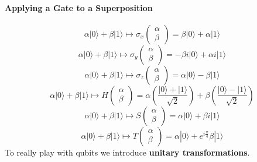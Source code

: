 \documentclass[10pt]{report}
\begin{document}
\paragraph{Applying a Gate to a Superposition}
$$\alpha|0\rangle + \beta|1\rangle \mapsto \sigma_x\left(\begin{array}{c}
\alpha\\\beta
\end{array}\right) = \beta|0\rangle + \alpha|1\rangle$$
$$\alpha|0\rangle + \beta|1\rangle \mapsto \sigma_y\left(\begin{array}{c}
\alpha\\\beta
\end{array}\right) = -\beta i|0\rangle + \alpha i|1\rangle$$
$$\alpha|0\rangle + \beta|1\rangle \mapsto \sigma_z\left(\begin{array}{c}
\alpha\\\beta
\end{array}\right) = \alpha|0\rangle - \beta|1\rangle$$
$$\alpha|0\rangle + \beta|1\rangle \mapsto H\left(\begin{array}{c}
\alpha\\\beta
\end{array}\right) = \alpha\left(\frac{|0\rangle + |1\rangle}{\sqrt{2}}\right) + \beta\left(\frac{|0\rangle - |1\rangle}{\sqrt{2}}\right)$$
$$\alpha|0\rangle + \beta|1\rangle \mapsto S\left(\begin{array}{c}
\alpha\\\beta
\end{array}\right) = \alpha|0\rangle + \beta i|1\rangle$$
$$\alpha|0\rangle + \beta|1\rangle \mapsto T\left(\begin{array}{c}
\alpha\\\beta
\end{array}\right) = \alpha|0\rangle + e^{i\frac{\pi}{4}}\beta|1\rangle$$
To really play with qubits we introduce \textbf{unitary transformations}.
\end{document}
